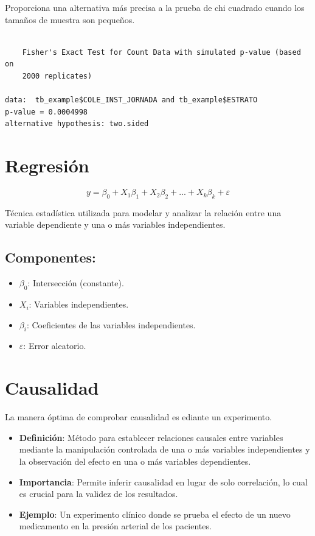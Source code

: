 \documentclass[
  letterpaper,
  DIV=11,
  numbers=noendperiod]{scrreprt}
\providecommand{\tightlist}{%
  \setlength{\itemsep}{0pt}\setlength{\parskip}{0pt}}\usepackage{longtable,booktabs,array}
\begin{document}
Proporciona una alternativa más precisa a la prueba de chi cuadrado
cuando los tamaños de muestra son pequeños.

\begin{verbatim}

    Fisher's Exact Test for Count Data with simulated p-value (based on
    2000 replicates)

data:  tb_example$COLE_INST_JORNADA and tb_example$ESTRATO
p-value = 0.0004998
alternative hypothesis: two.sided
\end{verbatim}

\section{Regresión}\label{regresiuxf3n}

\[
y = \beta_0 + X_1 \beta_1 + X_2 \beta_2 + ... + X_k\beta_k + \varepsilon
\]

Técnica estadística utilizada para modelar y analizar la relación entre
una variable dependiente y una o más variables independientes.

\subsection{Componentes:}\label{componentes}

\begin{itemize}
\tightlist
\item
  \(\beta_0\): Intersección (constante).
\item
  \(X_i\): Variables independientes.
\item
  \(\beta_i\): Coeficientes de las variables independientes.
\item
  \(\varepsilon\): Error aleatorio.
\end{itemize}

\section{Causalidad}\label{causalidad}

La manera óptima de comprobar causalidad es ediante un experimento.

\begin{itemize}
\tightlist
\item
  \textbf{Definición}: Método para establecer relaciones causales entre
  variables mediante la manipulación controlada de una o más variables
  independientes y la observación del efecto en una o más variables
  dependientes.
\item
  \textbf{Importancia}: Permite inferir causalidad en lugar de solo
  correlación, lo cual es crucial para la validez de los resultados.
\item
  \textbf{Ejemplo}: Un experimento clínico donde se prueba el efecto de
  un nuevo medicamento en la presión arterial de los pacientes.
\end{itemize}
\end{document}
